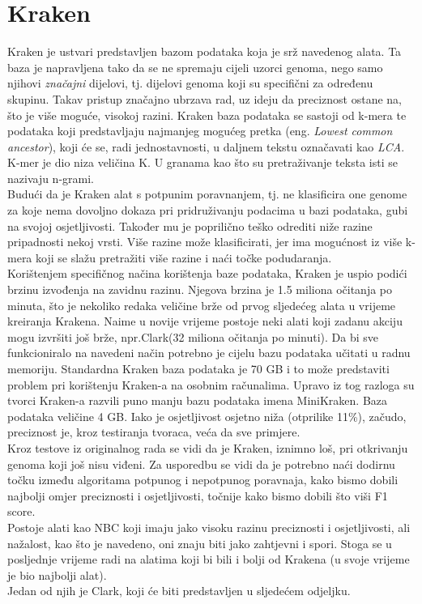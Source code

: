 \documentclass[times, utf8, seminar]{fer}
\begin{document}
\section{Kraken}
Kraken je ustvari predstavljen bazom podataka koja je srž navedenog alata. Ta baza je napravljena tako da se ne spremaju cijeli uzorci genoma, nego samo njihovi \textit{značajni} dijelovi, tj. dijelovi genoma koji su specifični za određenu skupinu. Takav pristup značajno ubrzava rad, uz ideju da preciznost ostane na, što je više moguće, visokoj razini. Kraken baza podataka se sastoji od k-mera te podataka koji predstavljaju najmanjeg mogućeg pretka (eng. \textit{Lowest common ancestor}), koji će se, radi jednostavnosti, u daljnem tekstu označavati kao \textit{LCA}.
\\K-mer je dio niza veličina K. U granama kao što su pretraživanje teksta isti se nazivaju n-grami. %
\\Budući da je Kraken alat s potpunim poravnanjem, tj. ne klasificira one genome za koje nema dovoljno dokaza pri pridruživanju podacima u bazi podataka, gubi na svojoj osjetljivosti. Također mu je poprilično teško odrediti niže razine pripadnosti nekoj vrsti. Više razine može klasificirati, jer ima mogućnost iz više k-mera koji se slažu pretražiti više razine i naći točke podudaranja.
\\Korištenjem specifičnog načina korištenja baze podataka, Kraken je uspio podići brzinu izvođenja na zavidnu razinu. Njegova brzina je 1.5 miliona očitanja po minuta, što je nekoliko redaka veličine brže od prvog sljedećeg alata u vrijeme kreiranja Krakena. Naime u novije vrijeme postoje neki alati koji zadanu akciju mogu izvršiti još brže, npr.Clark(32 miliona očitanja po minuti). Da bi sve funkcioniralo na navedeni način potrebno je cijelu bazu podataka učitati u radnu memoriju. Standardna Kraken baza podataka je 70 GB i to može predstaviti problem pri korištenju Kraken-a na osobnim računalima.
Upravo iz tog razloga su tvorci Kraken-a razvili puno manju bazu podataka imena MiniKraken. Baza podataka veličine 4 GB. Iako je osjetljivost osjetno niža (otprilike 11\%), začudo, preciznost je, kroz testiranja tvoraca, veća da sve primjere.
\\Kroz testove iz originalnog rada se vidi da je Kraken, iznimno loš, pri otkrivanju genoma koji još nisu viđeni. Za usporedbu se vidi da je potrebno naći dodirnu točku između algoritama potpunog i nepotpunog poravnaja, kako bismo dobili najbolji omjer preciznosti i osjetljivosti, točnije kako bismo dobili što viši F1 score.
\\Postoje alati kao NBC koji imaju jako visoku razinu preciznosti i osjetljivosti, ali nažalost, kao što je navedeno, oni znaju biti jako zahtjevni i spori. Stoga se u posljednje vrijeme radi na alatima koji bi bili i bolji od Krakena (u svoje vrijeme je bio najbolji alat).
\\Jedan od njih je Clark, koji će biti predstavljen u sljedećem odjeljku.
\end{document}

